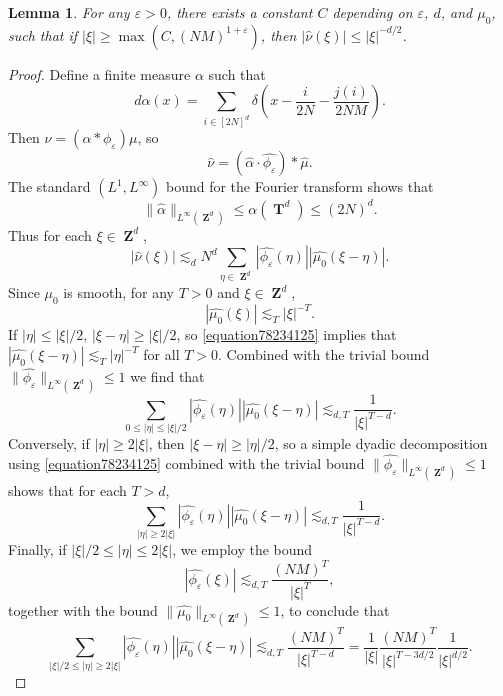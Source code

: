 \documentclass[12pt,reqno]{article}
\DeclareMathOperator{\ZZ}{\mathbf{Z}}
\DeclareMathOperator{\TT}{\mathbf{T}}
\newtheorem{lemma}[theorem]{Lemma}
\begin{document}
\begin{lemma}
    For any $\varepsilon > 0$, there exists a constant $C$ depending on $\varepsilon$, $d$, and $\mu_0$, such that if $|\xi| \geq \max( C, (NM)^{1 + \varepsilon})$, then $|\widehat{\nu}(\xi)| \leq |\xi|^{-d/2}$.
\end{lemma}
\begin{proof}
    Define a finite measure $\alpha$ such that
    \[ d\alpha(x) = \sum_{i \in [2N]^d} \delta \left( x - \frac{i}{2N} - \frac{j(i)}{2NM} \right). \]
    Then $\nu = (\alpha * \phi_\varepsilon) \mu$, so
    \[ \widehat{\nu} = \left(\widehat{\alpha} \cdot \widehat{\phi_\varepsilon} \right) * \widehat{\mu}. \]
    The standard $(L^1,L^\infty)$ bound for the Fourier transform shows that
    \[ \| \widehat{\alpha} \|_{L^\infty(\ZZ^d)} \leq \alpha(\TT^d) \leq (2N)^d. \]
    Thus for each $\xi \in \ZZ^d$,
    \[ |\widehat{\nu}(\xi)| \lesssim_d N^d \sum_{\eta \in \ZZ^d} |\widehat{\phi_\varepsilon}(\eta)| |\widehat{\mu_0}(\xi-\eta)|. \]
    Since $\mu_0$ is smooth, for any $T > 0$ and $\xi \in \ZZ^d$,
    \begin{equation} \label{equation78234125}
        |\widehat{\mu_0}(\xi)| \lesssim_T |\xi|^{-T}.
    \end{equation}
    If $|\eta| \leq |\xi|/2$, $|\xi - \eta| \geq |\xi|/2$, so \eqref{equation78234125} implies that $|\widehat{\mu_0}(\xi - \eta)| \lesssim_T |\eta|^{-T}$ for all $T > 0$. Combined with the trivial bound $\| \widehat{\phi_\varepsilon} \|_{L^\infty(\ZZ^d)} \leq 1$ we find that
    \[ \sum_{0 \leq |\eta| \leq |\xi|/2} |\widehat{\phi_\varepsilon}(\eta)| |\widehat{\mu_0}(\xi-\eta)| \lesssim_{d,T} \frac{1}{|\xi|^{T-d}}. \]
    Conversely, if $|\eta| \geq 2 |\xi|$, then $|\xi - \eta| \geq |\eta|/2$, so a simple dyadic decomposition using \eqref{equation78234125} combined with the trivial bound $\| \widehat{\phi_\varepsilon} \|_{L^\infty(\ZZ^d)} \leq 1$ shows that for each $T > d$,
    \[ \sum_{|\eta| \geq 2 |\xi|} |\widehat{\phi_\varepsilon}(\eta)| |\widehat{\mu_0}(\xi-\eta)| \lesssim_{d,T} \frac{1}{|\xi|^{T-d}}. \]
    Finally, if $|\xi|/2 \leq |\eta| \leq 2|\xi|$, we employ the bound
    \[ |\widehat{\phi_\varepsilon}(\xi)| \lesssim_{d,T} \frac{(NM)^T}{|\xi|^T}, \]
    together with the bound $\| \widehat{\mu_0} \|_{L^\infty(\ZZ^d)} \leq 1$, to conclude that
    \[ \sum_{|\xi|/2 \leq |\eta| \geq 2 |\xi|} |\widehat{\phi_\varepsilon}(\eta)| |\widehat{\mu_0}(\xi-\eta)| \lesssim_{d,T} \frac{(NM)^T}{|\xi|^{T-d}} = \frac{1}{|\xi|} \frac{(NM)^T}{|\xi|^{T-3d/2}} \frac{1}{|\xi|^{d/2}}. \]

\end{proof}
\end{document}
